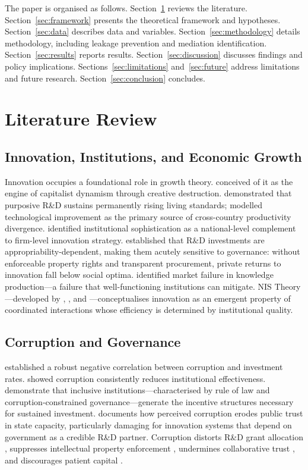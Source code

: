 \documentclass[pdflatex,sn-apa]{sn-jnl}
\begin{document}
The paper is organised as follows. Section~\ref{sec:literature} reviews the literature. Section~\ref{sec:framework} presents the theoretical framework and hypotheses. Section~\ref{sec:data} describes data and variables. Section~\ref{sec:methodology} details methodology, including leakage prevention and mediation identification. Section~\ref{sec:results} reports results. Section~\ref{sec:discussion} discusses findings and policy implications. Sections~\ref{sec:limitations} and~\ref{sec:future} address limitations and future research. Section~\ref{sec:conclusion} concludes.

\section{Literature Review}
\label{sec:literature}

\subsection{Innovation, Institutions, and Economic Growth}

Innovation occupies a foundational role in growth theory. \citet{schumpeter1934} conceived of it as the engine of capitalist dynamism through creative destruction. \citet{romer1990} demonstrated that purposive R\&D sustains permanently rising living standards; \citet{aghion1992} modelled technological improvement as the primary source of cross-country productivity divergence. \citet{porter1990} identified institutional sophistication as a national-level complement to firm-level innovation strategy. \citet{hall2010} established that R\&D investments are appropriability-dependent, making them acutely sensitive to governance: without enforceable property rights and transparent procurement, private returns to innovation fall below social optima. \citet{arrow1962} identified market failure in knowledge production---a failure that well-functioning institutions can mitigate. NIS Theory---developed by \citet{freeman1987}, \citet{lundvall1992}, and \citet{nelson1993}---conceptualises innovation as an emergent property of coordinated interactions whose efficiency is determined by institutional quality.

\subsection{Corruption and Governance}

\citet{mauro1995} established a robust negative correlation between corruption and investment rates. \citet{meon2005} showed corruption consistently reduces institutional effectiveness. \citet{acemoglu2012} demonstrate that inclusive institutions---characterised by rule of law and corruption-constrained governance---generate the incentive structures necessary for sustained investment. \citet{quah2011} documents how perceived corruption erodes public trust in state capacity, particularly damaging for innovation systems that depend on government as a credible R\&D partner. Corruption distorts R\&D grant allocation \citep{mauro1995}, suppresses intellectual property enforcement \citep{hall2010}, undermines collaborative trust \citep{lundvall1992,oecd2015}, and discourages patient capital \citep{north1990}.
\end{document}
